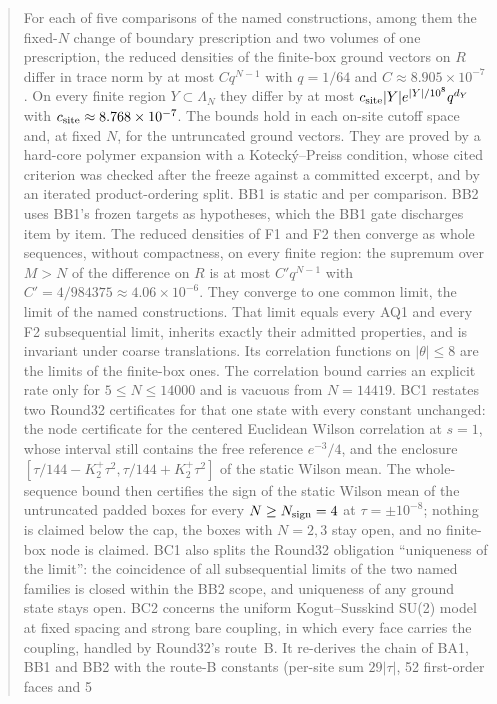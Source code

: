 \documentclass[11pt,a4paper]{article}
\begin{document}
\begin{abstract}
For each of five comparisons of the named constructions, among them the
fixed-$N$ change of boundary prescription and two volumes of one
prescription, the reduced densities of the finite-box ground vectors on $R$
differ in trace norm by at most $Cq^{N-1}$ with $q=1/64$ and
$C\approx8.905\times10^{-7}$. On every finite region $Y\subset\Lambda_N$ they
differ by at most $c_{\rm site}|Y|e^{|Y|/10^8}q^{d_Y}$ with
$c_{\rm site}\approx8.768\times10^{-7}$. The bounds hold in each on-site
cutoff space and, at fixed $N$, for the untruncated ground vectors. They are
proved by a hard-core polymer expansion with a Kotecký--Preiss condition,
whose cited criterion was checked after the freeze against a committed
excerpt, and by an iterated product-ordering split. BB1 is static and per
comparison. BB2 uses BB1's frozen targets as hypotheses, which the BB1 gate
discharges item by item. The reduced densities of F1 and F2 then converge as
whole sequences, without compactness, on every finite region: the supremum
over $M>N$ of the difference on $R$ is at most $C'q^{N-1}$ with
$C'=4/984375\approx4.06\times10^{-6}$. They converge to one common limit, the
limit of the named constructions. That limit equals every AQ1 and every F2
subsequential limit, inherits exactly their admitted properties, and is
invariant under coarse translations. Its correlation functions on
$|\theta|\le8$ are the limits of the finite-box ones. The correlation bound
carries an explicit rate only for $5\le N\le14000$ and is vacuous from
$N=14419$. BC1 restates two Round32 certificates for that one state with
every constant unchanged: the node certificate for the centered Euclidean
Wilson correlation at $s=1$, whose interval still contains the free
reference $e^{-3}/4$, and the enclosure
$[\tau/144-K_2^+\tau^2,\tau/144+K_2^+\tau^2]$ of the static Wilson mean. The
whole-sequence bound then certifies the sign of the static Wilson mean of the
untruncated padded boxes for every $N\ge N_{\rm sign}=4$ at
$\tau=\pm10^{-8}$; nothing is claimed below the cap, the boxes with $N=2,3$
stay open, and no finite-box node is claimed.
BC1 also splits the Round32 obligation ``uniqueness of the limit'': the
coincidence of all subsequential limits of the two named families is closed
within the BB2 scope, and uniqueness of any ground state stays open. BC2
concerns the uniform Kogut--Susskind SU(2) model at fixed spacing and strong
bare coupling, in which every face carries the coupling, handled by
Round32's route~B. It re-derives the chain of BA1, BB1 and BB2 with the
route-B constants (per-site sum $29|\tau|$, 52 first-order faces and 5

\end{abstract}
\end{document}
